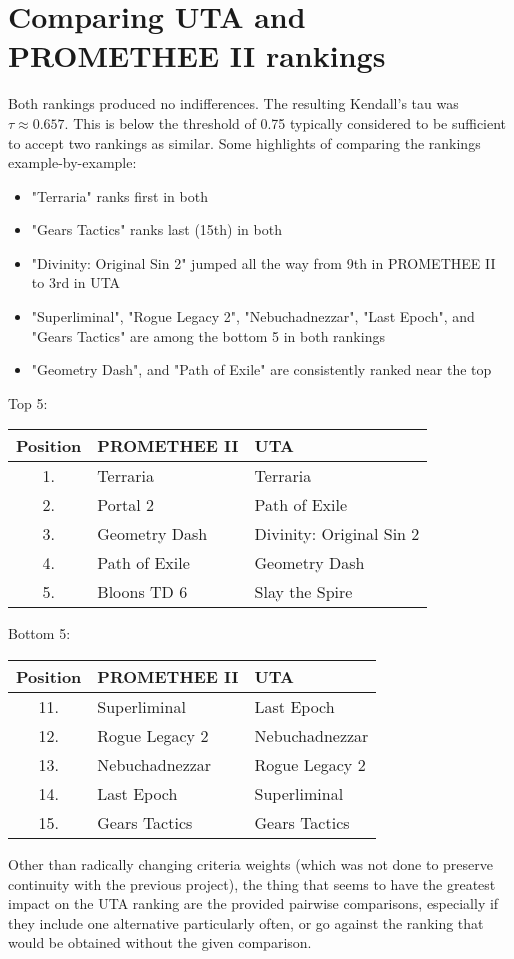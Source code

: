 \documentclass{article}
\begin{document}
\section{Comparing UTA and PROMETHEE II rankings}

Both rankings produced no indifferences.
The resulting Kendall's tau was $ \tau \approx 0.657 $.
This is below the threshold of 0.75 typically considered to be sufficient to accept two rankings as similar. Some highlights of comparing the rankings example-by-example:

\begin{itemize}
    \item "Terraria" ranks first in both
    \item "Gears Tactics" ranks last (15th) in both
    \item "Divinity: Original Sin 2" jumped all the way from 9th in PROMETHEE II to 3rd in UTA
    \item "Superliminal", "Rogue Legacy 2", "Nebuchadnezzar", "Last Epoch", and "Gears Tactics" are among the bottom 5 in both rankings
    \item "Geometry Dash", and "Path of Exile" are consistently ranked near the top
\end{itemize}

Top 5:
\begin{center}
\begin{tabular}{ c|m{8em}|m{12em} }
    Position & PROMETHEE II & UTA \\
    \hline
    \hline
    1. & Terraria & Terraria \\
    2. & Portal 2 & Path of Exile \\
    3. & Geometry Dash & Divinity: Original Sin 2 \\
    4. & Path of Exile & Geometry Dash \\
    5. & Bloons TD 6 & Slay the Spire \\
\end{tabular}
\end{center}

Bottom 5:
\begin{center}
\begin{tabular}{ c|m{8em}|m{8em} }
    Position & PROMETHEE II & UTA \\
    \hline
    \hline
    11. & Superliminal & Last Epoch  \\
    12. & Rogue Legacy 2 & Nebuchadnezzar  \\
    13. & Nebuchadnezzar & Rogue Legacy 2 \\
    14. & Last Epoch & Superliminal \\
    15. & Gears Tactics & Gears Tactics \\

\end{tabular}
\end{center}

Other than radically changing criteria weights (which was not done to preserve continuity with the previous project), the thing that seems to have the greatest impact on the UTA ranking are the provided pairwise comparisons, especially if they include one alternative particularly often, or go against the ranking that would be obtained without the given comparison.
\end{document}
